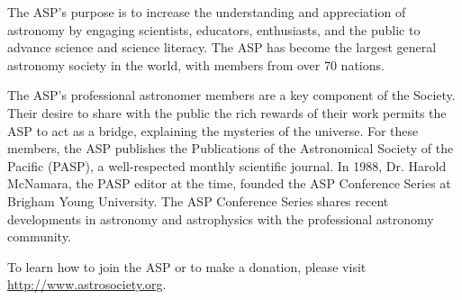 {\vspace{5pt}
The ASP's purpose is to increase the understanding and appreciation of 
astronomy by engaging scientists, educators, enthusiasts, and the public to 
advance science and science literacy. The ASP has become the largest 
general astronomy society in the world, with members from over 70 nations.

\vspace{5pt}
The ASP's professional astronomer members are a key component of the
Society. Their desire to share with the public the rich rewards of 
their work permits the ASP to act as a bridge, explaining the mysteries 
of the universe. For these members, the ASP publishes the Publications 
of the Astronomical Society of the Pacific (PASP), a well-respected monthly 
scientific journal. In 1988, Dr. Harold McNamara, the PASP editor at 
the time, founded the ASP Conference Series at Brigham Young University.  
The ASP Conference Series shares recent developments in 
astronomy and astrophysics with the professional astronomy community.

\bigskip

\begin{center}
{\Large To learn how to join the ASP or to make a donation, please visit \url{http://www.astrosociety.org}.}
\end{center}}

\vfill
\eject

